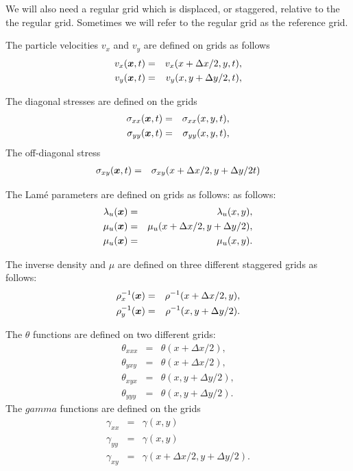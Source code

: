 \documentclass[11pt]{article}
\begin{document}
We will also need a regular grid which is displaced, or staggered, 
relative to the the regular grid.
Sometimes we will refer to the regular grid as the reference grid.

The particle velocities  $v_x$ and $v_y$ are defined on grids
as follows
%
\begin{eqnarray}
  v_x(\mbox{\boldmath $x$}, t) & = & v_x(x+\Delta x/2, y, t),\nonumber\\
  v_y(\mbox{\boldmath $x$}, t) & = & v_y(x, y+\Delta y/2, t),\nonumber\\
\end{eqnarray}
%


The diagonal stresses are defined on the grids
\begin{eqnarray}
  \sigma_{xx}(\mbox{\boldmath $x$}, t) & = & \sigma_{xx}( x,y,t), \nonumber\\
  \sigma_{yy}(\mbox{\boldmath $x$}, t) & = & \sigma_{yy}(x, y,t), \nonumber\\
\end{eqnarray}
The off-diagonal stress 
%
\begin{eqnarray}
  \sigma_{xy}(\mbox{\boldmath $x$}, t) & = & \sigma_{xy}(x +\Delta x/2, y+\Delta y/2t) 
                                        \nonumber\\
\end{eqnarray}

The Lam\'{e} parameters are defined on grids as follows:
as follows:
%
\begin{eqnarray}
   \lambda_u(\mbox{\boldmath $x$}) & = & \lambda_u(x,y),\\
   \mu_u(\mbox{\boldmath $x$})     & = & \mu_u(x+\Delta x/2,y+\Delta y/2), \nonumber\\
   \mu_u(\mbox{\boldmath $x$})     & = & \mu_u(x,y).
\end{eqnarray}

The inverse density and $\mu$ are defined  on three different staggered grids as follows:
\begin{eqnarray}
   \rho_x^{-1}(\mbox{\boldmath $x$}) & = & \rho^{-1}(x+\Delta x/2, y),       \nonumber\\
   \rho_y^{-1}(\mbox{\boldmath $x$}) & = & \rho^{-1}(x,y+\Delta y/2).        \nonumber
\end{eqnarray}

The $\theta$ functions are defined on two different grids:
\begin{eqnarray}
   \theta_{xxx} & = & \theta(x+\Delta x/2),\\
   \theta_{yxy} & = & \theta(x+\Delta x/2),\\
   \theta_{xyx} & = & \theta(x,y+\Delta y/2),\\
   \theta_{yyy} & = & \theta(x,y+\Delta y/2).
\end{eqnarray}
The $gamma$ functions are defined on the grids
\begin{eqnarray}
   \gamma_{xx} & = & \gamma(x,y)\\
   \gamma_{yy} & = & \gamma(x,y)\\
   \gamma_{xy} & = & \gamma(x+\Delta x/2,y+\Delta y/2).
\end{eqnarray}
\end{document}
